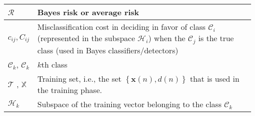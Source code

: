 \begin{xltabular}{\textwidth}{XX}
	\(\mathscr{R}\)                                                                                                                                                                & Bayes risk or average risk \cite{haykinNeuralNetworksLearning2009}                                                                                                                                                                                                                                                                     \\ \hline
	\(c_{ij}, C_{ij}\)                                                                                                                                                             & Misclassification cost in deciding in favor of class \(\mathscr{C}_i\) (represented in the subspace \(\mathscr{H}_i\)) when the \(\mathscr{C}_j\) is the true class (used in Bayes classifiers/detectors) \cite{haykinNeuralNetworksLearning2009,CharlesPES}                                                                           \\ \hline
	\(\mathscr{C}_k\)\cite{haykinNeuralNetworksLearning2009}, \(\mathcal{C}_k\) \cite{bishopPatternRecognitionMachine2006}                                                                                                                                                              & \(k\)th class                                                                                                                                                                                                                                                                                  \\ \hline
	\(\mathscr{T}\) \cite{haykinNeuralNetworksLearning2009}, \(\mathbb{X}\) \cite{goodfellowDeepLearning2016}                                                                      & Training set, i.e., the set \(\left\{ \mathbf{x}(n), d(n) \right\}\) that is used in the training phase.                                                                                                                                                                                                                               \\ \hline
	\(\mathscr{H}_k\)                                                                                                                                                              & Subspace of the training vector belonging to the class \(\mathscr{C}_k\)                                                                                                                                                                                                                                                               \\ \hline

\end{xltabular}
